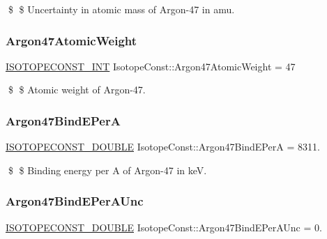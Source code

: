 \$ \$ Uncertainty in atomic mass of Argon-\/47 in amu. \mbox{\label{group___isotope_const-_argon-_ar47_gaf250f9f0edb0824b68380015930a864f}} 
\subsubsection{\texorpdfstring{Argon47\+Atomic\+Weight}{Argon47AtomicWeight}}
{\footnotesize\ttfamily \mbox{\hyperlink{group___isotope_const-_macros_ga5f18360b3e99483a35c32d789e62621c}{I\+S\+O\+T\+O\+P\+E\+C\+O\+N\+S\+T\+\_\+\+I\+NT}} Isotope\+Const\+::\+Argon47\+Atomic\+Weight = 47}

\$ \$ Atomic weight of Argon-\/47. \mbox{\label{group___isotope_const-_argon-_ar47_ga7f216305cb0f8d1986eadc4143f3f036}} 
\subsubsection{\texorpdfstring{Argon47\+Bind\+E\+PerA}{Argon47BindEPerA}}
{\footnotesize\ttfamily \mbox{\hyperlink{group___isotope_const-_macros_ga8f45a7272ce02c0b4c65c44636ed719a}{I\+S\+O\+T\+O\+P\+E\+C\+O\+N\+S\+T\+\_\+\+D\+O\+U\+B\+LE}} Isotope\+Const\+::\+Argon47\+Bind\+E\+PerA = 8311.}

\$ \$ Binding energy per A of Argon-\/47 in keV. \mbox{\label{group___isotope_const-_argon-_ar47_ga5cc2e87d90164e49eb4f0fe17259dc29}} 
\subsubsection{\texorpdfstring{Argon47\+Bind\+E\+Per\+A\+Unc}{Argon47BindEPerAUnc}}
{\footnotesize\ttfamily \mbox{\hyperlink{group___isotope_const-_macros_ga8f45a7272ce02c0b4c65c44636ed719a}{I\+S\+O\+T\+O\+P\+E\+C\+O\+N\+S\+T\+\_\+\+D\+O\+U\+B\+LE}} Isotope\+Const\+::\+Argon47\+Bind\+E\+Per\+A\+Unc = 0.}

